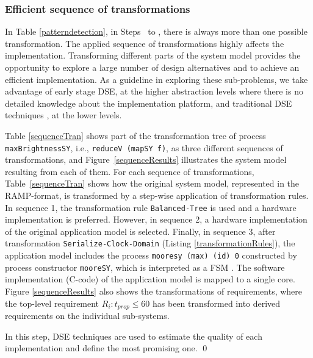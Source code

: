 \subsubsection{Efficient sequence  of  transformations}
In Table \ref{patterndetection}, in Steps~ to , there is always more than one possible transformation. The applied sequence of  transformations highly affects the implementation. Transforming different parts of the system model provides the opportunity to explore a large number of design alternatives and to achieve an efficient implementation. As a guideline in exploring these sub-problems, we take advantage of early stage DSE, at the higher abstraction levels where there is no detailed knowledge about the implementation platform, and traditional DSE techniques \cite{pimentel2016exploring}, at the lower levels.
\begin{exmp}
Table \ref{sequenceTran} shows part of the transformation tree of process \texttt{maxBrightnessSY}, i.e., \texttt{reduceV~(mapSY f)}, as three different sequences of transformations, and Figure~\ref{sequenceResults} illustrates the system model resulting from each of them.
For each sequence of transformations, Table~\ref{sequenceTran} shows how the original system model, represented in the RAMP-format, is transformed by a step-wise application of transformation rules. 
In sequence 1, the transformation rule \texttt{Balanced-Tree} is used and a hardware implementation is preferred. However, in sequence 2,  a hardware implementation of the original application model is selected. Finally, in sequence 3, after transformation \texttt{Serialize-Clock-Domain} (Listing \ref{transformationRules}), the application model includes the process \texttt{mooresy (max) (id) 0} constructed by process constructor \texttt{mooreSY}, which is interpreted as a FSM \cite{sander2004system}. The software implementation (C-code) of the application model is mapped to a single core. Figure \ref{sequenceResults} also shows the transformations of requirements, where the top-level requirement $R_i:t_{prop}\leq60$ has been transformed into derived requirements on the individual sub-systems. 

In this step, DSE techniques are used to estimate the quality of each implementation and define the most promising one. \qed
\end{exmp}






